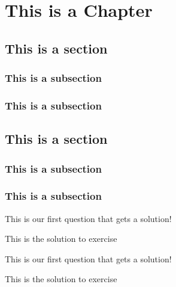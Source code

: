 \documentclass[palette=nighthill]{formatacao/classe-apostila}
\begin{document}
\chapter{This is a Chapter}\label{cap02}
\section{This is a section}
\subsection{This is a subsection}
\lipsum[1-3]

\begin{definicao}
\lipsum[1-1]
\end{definicao}

\lipsum[1-2]

\subsection{This is a subsection}
\lipsum[1-2]

\section{This is a section}
\subsection{This is a subsection}
\lipsum[1-1]
\subsection{This is a subsection}
\lipsum[1-2]

\begin{exercicios}
\begin{question} 
This is our first question that gets a solution!
\end{question}
\begin{solution}
This is the solution to exercise
\end{solution}
\begin{question} 
This is our first question that gets a solution!
\end{question}
\begin{solution}
This is the solution to exercise
\end{solution}
\end{exercicios}

\end{document}
